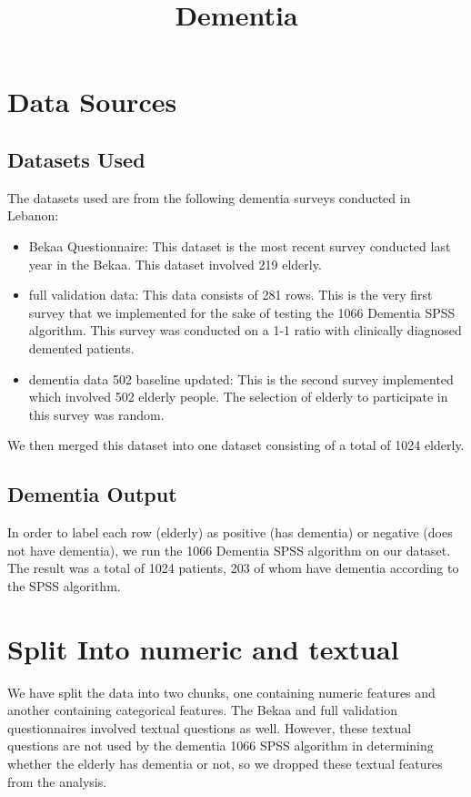 \documentclass{article}
\title{Dementia}
\begin{document}
\maketitle

\tableofcontents

\section{Data Sources}
\subsection{Datasets Used}
The datasets used are from the following dementia surveys conducted in Lebanon:
\begin{itemize}
    \item Bekaa Questionnaire: This dataset is the most recent survey conducted last year in the Bekaa. This dataset involved 219 elderly.
    \item full validation data: This data consists of 281 rows. This is the very first survey that we implemented for the sake of testing the 1066 Dementia SPSS algorithm. This survey was conducted on a 1-1 ratio with clinically diagnosed demented patients.
    \item dementia data 502 baseline updated: This is the second survey implemented which involved 502 elderly people. The selection of elderly to participate in this survey was random.
\end{itemize}
We then merged this dataset into one dataset consisting of a total of 1024 elderly.

\subsection{Dementia Output}
In order to label each row (elderly) as positive (has dementia) or negative (does not have dementia), we run the 1066 Dementia SPSS algorithm on our dataset. The result was a total of 1024 patients, 203 of whom have dementia according to the SPSS algorithm.

\section{Split Into numeric and textual}
We have split the data into two chunks, one containing numeric features and another containing categorical features. The Bekaa and full validation questionnaires involved textual questions as well. However, these textual questions are not used by the dementia 1066 SPSS algorithm in determining whether the elderly has dementia or not, so we dropped these textual features from the analysis.
\end{document}
